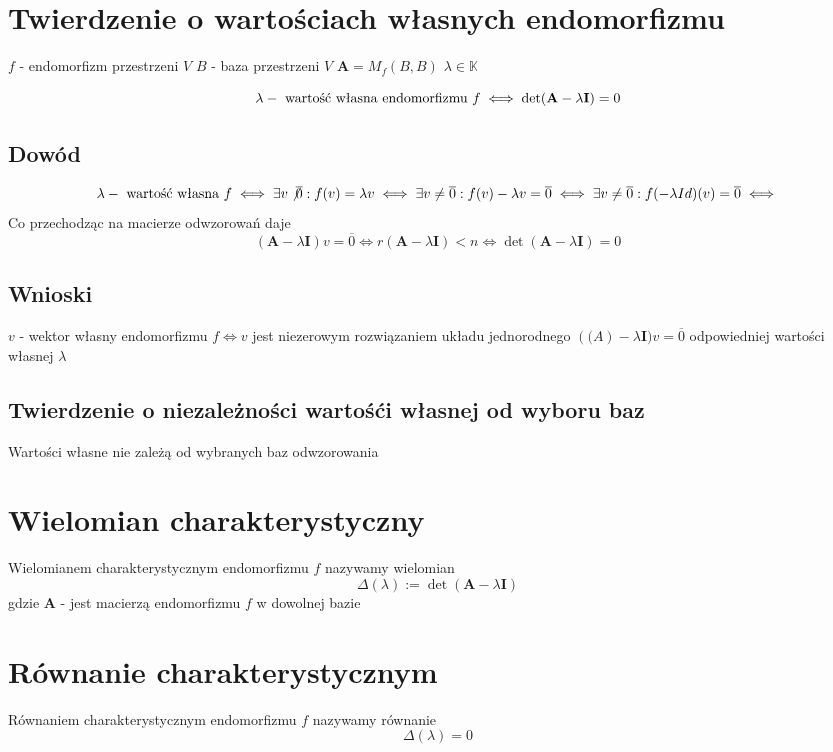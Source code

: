 \documentclass[11pt]{article}
\begin{document}
\newpage
\section{Twierdzenie o wartościach własnych endomorfizmu}
$f$ - endomorfizm przestrzeni $V$ 
$B$ - baza przestrzeni $V$
$\mathbf{A} = M_f(B,B)$
$\lambda \in \mathbb{K} $

$$ \lambda - \hbox{ wartość własna endomorfizmu } f \iff \det(\mathbf{A} - \lambda \mathbf{I}) = 0 $$

\subsection{Dowód}
$$ \lambda - \hbox{ wartość własna } f 
\iff \exists v \not \overline{0} : f(v) = \lambda v
\iff \exists v \not = \overline{0} : f(v) - \lambda v = \overline{0}
\iff \exists v \not = \overline{0} : f( - \lambda Id)(v) = \overline{0} \iff $$
Co przechodząc na macierze odwzorowań daje 
$$ (\mathbf{A} - \lambda \mathbf{I}) v = \overline{0}
\iff r(\mathbf{A} - \lambda \mathbf{I}) < n
\iff \det(\mathbf{A} - \lambda \mathbf{I}) = 0 $$

\subsection{Wnioski}
$v$ - wektor własny endomorfizmu $f \iff v $ jest niezerowym rozwiązaniem układu jednorodnego $(\mathbf(A) - \lambda \mathbf{I}) v = \overline{0}$ odpowiedniej wartości własnej $\lambda$

\subsection{ Twierdzenie o niezależności wartośći własnej od wyboru baz }
Wartości własne nie zależą od wybranych baz odwzorowania

\section{Wielomian charakterystyczny}
Wielomianem charakterystycznym endomorfizmu $f$ nazywamy wielomian 
$$ \Delta (\lambda) := \det{(\mathbf{A} - \lambda \mathbf{I})} $$
gdzie  $\mathbf{A}$ - jest macierzą endomorfizmu $f$ w dowolnej bazie

\section{Równanie charakterystycznym}
Równaniem charakterystycznym endomorfizmu $f$ nazywamy równanie
$$ \Delta (\lambda) = 0 $$
\end{document}
